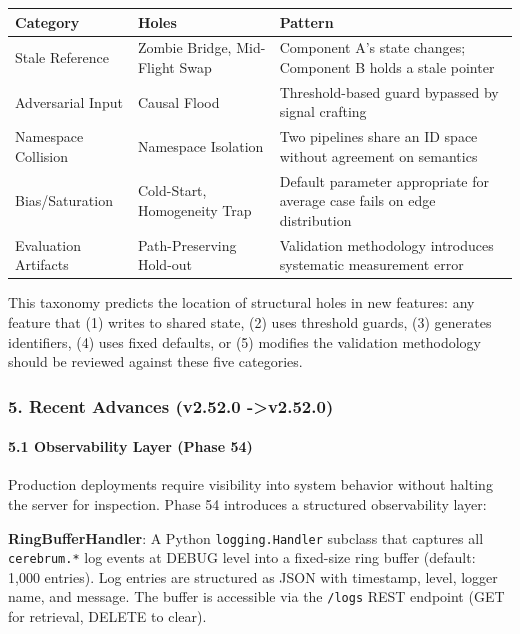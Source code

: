 \begin{center}
{\footnotesize
\begin{tabularx}{\columnwidth}{|>{\raggedright\arraybackslash}X|>{\raggedright\arraybackslash}X|>{\raggedright\arraybackslash}X|}
\hline
Category & Holes & Pattern \\ \hline
Stale Reference & Zombie Bridge, Mid-Flight Swap & Component A's state changes; Component B holds a stale pointer \\ \hline
Adversarial Input & Causal Flood & Threshold-based guard bypassed by signal crafting \\ \hline
Namespace Collision & Namespace Isolation & Two pipelines share an ID space without agreement on semantics \\ \hline
Bias/Saturation & Cold-Start, Homogeneity Trap & Default parameter appropriate for average case fails on edge distr\-ibution \\ \hline
Evaluation Artifacts & Path-Preserving Hold-out & Validation methodology introduces systematic measurement error \\ \hline
\end{tabularx}
}
\end{center}

This taxonomy predicts the location of structural holes in new features: any feature that (1) writes to shared state, (2) uses threshold guards, (3) generates identifiers, (4) uses fixed defaults, or (5) modifies the validation methodology should be reviewed against these five categories.

\subsubsection{5. Recent Advances (v2.52.0 -\textgreater  v2.52.0)}

\paragraph{5.1 Observ\-ability Layer (Phase 54)}
Production deployments require visibility into system behavior without halting the server for inspection. Phase 54 introduces a structured obser\-vability layer:

\textbf{RingBufferHandler}: A Python \texttt{logging.Handler} subclass that captures all \texttt{cerebrum.*} log events at DEBUG level into a fixed-size ring buffer (default: 1,000 entries). Log entries are structured as JSON with timestamp, level, logger name, and message. The buffer is accessible via the \texttt{/logs} REST endpoint (GET for retrieval, DELETE to clear).


